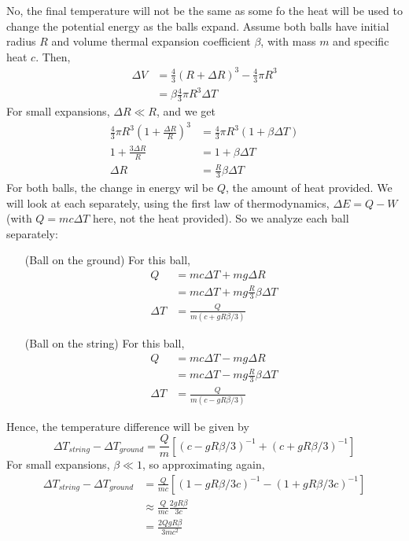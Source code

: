\documentclass{article}
\begin{document}
No, the final temperature will not be the same as some fo the heat will be used to change the potential energy as the balls expand. Assume both balls have initial radius $R$ and volume thermal expansion coefficient $\beta$, with mass $m$ and specific heat $c$. Then,
\begin{align*}
\Delta V &= \frac{4}{3}(R + \Delta R)^3 - \frac{4}{3}\pi R^3 \\
&= \beta \frac{4}{3} \pi R^3 \Delta T
\end{align*}
For small expansions, $\Delta R \ll R$, and we get
\begin{align*}
\frac{4}{3}\pi R^3\left(1+\frac{\Delta R}{R}\right)^3 &= \frac{4}{3}\pi R^3(1+\beta \Delta T) \\
1+\frac{3\Delta R}{R} &= 1 + \beta \Delta T \\
\Delta R &= \frac{R}{3}\beta \Delta T
\end{align*}
For both balls, the change in energy wil be $Q$, the amount of heat provided. We will look at each separately, using the first law of thermodynamics, $\Delta E = Q - W$ (with $Q = mc\Delta T$ here, not the heat provided). So we analyze each ball separately:
\begin{itemize}
	\item[(Ball on the ground)] For this ball,
	\begin{align*}
	Q &= mc\Delta T + mg\Delta R \\
	&= mc\Delta T + mg\frac{R}{3}\beta\Delta T \\
	\Delta T &= \frac{Q}{m(c+gR\beta /3)}
	\end{align*}
	\item[(Ball on the string)] For this ball,
	\begin{align*}
	Q &= mc\Delta T - mg\Delta R \\
	&= mc\Delta T - mg\frac{R}{3}\beta\Delta T \\
	\Delta T &= \frac{Q}{m(c-gR\beta /3)}
	\end{align*}
\end{itemize}
Hence, the temperature difference will be given by
\begin{equation}
\Delta T_{string} - \Delta T_{ground} = \frac{Q}{m}\left[(c-gR\beta /3)^{-1} + (c + gR\beta /3)^{-1}\right]
\end{equation}
For small expansions, $\beta\ll 1$, so approximating again,
\begin{align*}
\Delta T_{string} - \Delta T_{ground} &= \frac{Q}{mc}\left[(1-gR\beta /3c)^{-1} - (1+gR\beta /3c)^{-1}\right] \\
&\approx \frac{Q}{mc}\frac{2gR\beta}{3c} \\
&= \frac{2QgR\beta}{3mc^2}
\end{align*}
\end{document}

